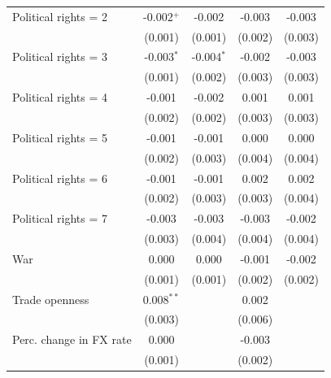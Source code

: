 \begin{table}[htbp]
\begin{tabular}{lcccc}
      Political rights = 2       & -0.002$^{+}$      & -0.002            & -0.003            & -0.003\\   
                                 & (0.001)           & (0.001)           & (0.002)           & (0.003)\\   
      Political rights = 3       & -0.003$^{*}$      & -0.004$^{*}$      & -0.002            & -0.003\\   
                                 & (0.001)           & (0.002)           & (0.003)           & (0.003)\\   
      Political rights = 4       & -0.001            & -0.002            & 0.001             & 0.001\\   
                                 & (0.002)           & (0.002)           & (0.003)           & (0.003)\\   
      Political rights = 5       & -0.001            & -0.001            & 0.000             & 0.000\\   
                                 & (0.002)           & (0.003)           & (0.004)           & (0.004)\\   
      Political rights = 6       & -0.001            & -0.001            & 0.002             & 0.002\\   
                                 & (0.002)           & (0.003)           & (0.003)           & (0.004)\\   
      Political rights = 7       & -0.003            & -0.003            & -0.003            & -0.002\\   
                                 & (0.003)           & (0.004)           & (0.004)           & (0.004)\\   
      War                        & 0.000             & 0.000             & -0.001            & -0.002\\   
                                 & (0.001)           & (0.001)           & (0.002)           & (0.002)\\   
      Trade openness             & 0.008$^{**}$      &                   & 0.002             &   \\   
                                 & (0.003)           &                   & (0.006)           &   \\   
      Perc. change in FX rate    & 0.000             &                   & -0.003            &   \\   
                                 & (0.001)           &                   & (0.002)           &   \\   

\end{tabular}
\end{table}
